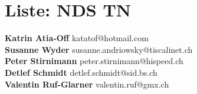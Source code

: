 \documentclass{scrartcl}
\begin{document}
\section*{Liste: NDS TN}
\textbf{Katrin Atia-Off } katatof@hotmail.com\\
\textbf{Susanne  Wyder } susanne.andriowsky@tiscalinet.ch\\
\textbf{Peter  Stirnimann } peter.stirnimann@hispeed.ch\\
\textbf{Detlef  Schmidt } detlef.schmidt@sid.bs.ch\\
\textbf{Valentin  Ruf-Glarner } valentin.ruf@gmx.ch\\
\textbf{} \\
\end{document}
